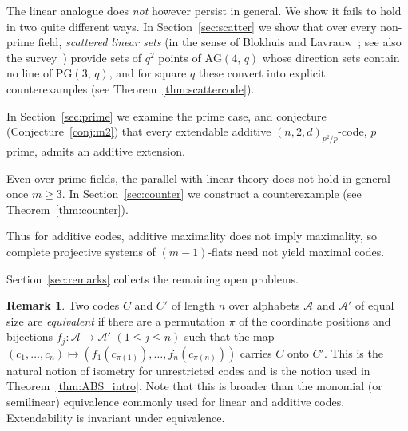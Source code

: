 \documentclass[12pt]{article}
\newtheorem{thm}{Theorem}[section]
\theoremstyle{definition}
\newtheorem{rem}[thm]{Remark}
\numberwithin{equation}{section}
\newcommand{\A}{\mathcal{A}}
\newcommand{\PG}[2]{\mathrm{PG}(#1,\,#2)}
\newcommand{\AG}[2]{\mathrm{AG}(#1,\,#2)}
\begin{document}
The linear analogue does \emph{not} however persist in general. We show it fails to hold in two quite different ways.  In Section~\ref{sec:scatter} we show that  over every non-prime field, \emph{scattered linear sets} (in the sense of Blokhuis and Lavrauw~\cite{MR1772204}; see also the survey~\cite{MR2684078}) provide sets of $q^2$ points of $\AG{4}{q}$ whose direction sets contain
no line of $\PG{3}{q}$, and for square $q$ these convert into explicit counterexamples (see Theorem~\ref{thm:scattercode}).


In Section~\ref{sec:prime} we examine the prime case, and conjecture
(Conjecture~\ref{conj:m2}) that every extendable additive $(n,2,d)_{p^2/p}$-code, $p$ prime, admits an additive extension.

Even over prime fields, the parallel with linear theory does not hold in general once $m\geq3$. In Section~\ref{sec:counter} we construct a counterexample (see Theorem~\ref{thm:counter}).


Thus for additive codes, additive maximality does not imply maximality, so complete projective systems of $(m-1)$-flats need not yield maximal codes.  

Section~\ref{sec:remarks} collects the remaining open problems.

\begin{rem}\label{rem:equiv}
Two codes $C$ and $C'$ of length $n$ over alphabets $\A$ and $\A'$ of equal size are \textit{equivalent} if there are a permutation $\pi$ of the coordinate positions and bijections $f_j:\A\to\A'$ $(1\le j\le n)$ such that the map $(c_1,\ldots,c_n)\mapsto (f_1(c_{\pi(1)}),\ldots,f_n(c_{\pi(n)}))$ carries $C$ onto $C'$.  This is the natural notion of isometry for unrestricted codes and is the notion used in Theorem~\ref{thm:ABS_intro}.  Note that this is broader than the monomial (or semilinear) equivalence commonly used for linear and additive
codes.  Extendability is invariant under equivalence.
\end{rem}
\end{document}
